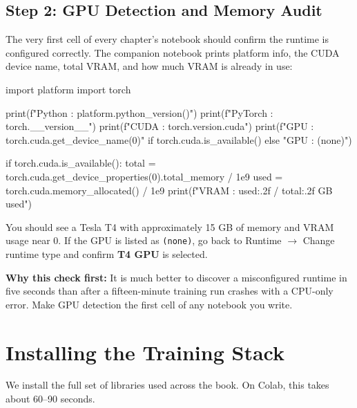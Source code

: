 \begin{chapterenv}
\subsection{Step 2: GPU Detection and Memory Audit}

The very first cell of every chapter's notebook should confirm the runtime is configured correctly. The companion notebook prints platform info, the CUDA device name, total VRAM, and how much VRAM is already in use:

\begin{codeblock}[python]
import platform
import torch

print(f"Python   : {platform.python_version()}")
print(f"PyTorch  : {torch.__version__}")
print(f"CUDA     : {torch.version.cuda}")
print(f"GPU      : {torch.cuda.get_device_name(0)}"
      if torch.cuda.is_available() else "GPU      : (none)")

if torch.cuda.is_available():
    total = torch.cuda.get_device_properties(0).total_memory / 1e9
    used  = torch.cuda.memory_allocated() / 1e9
    print(f"VRAM     : {used:.2f} / {total:.2f} GB used")
\end{codeblock}

You should see a Tesla T4 with approximately 15 GB of memory and VRAM usage near 0. If the GPU is listed as \texttt{(none)}, go back to Runtime $\rightarrow$ Change runtime type and confirm \textbf{T4 GPU} is selected.

\begin{tipbox}
\textbf{Why this check first:} It is much better to discover a misconfigured runtime in five seconds than after a fifteen-minute training run crashes with a CPU-only error. Make GPU detection the first cell of any notebook you write.
\end{tipbox}

\section{Installing the Training Stack}

We install the full set of libraries used across the book. On Colab, this takes about 60--90 seconds.


\end{chapterenv}
